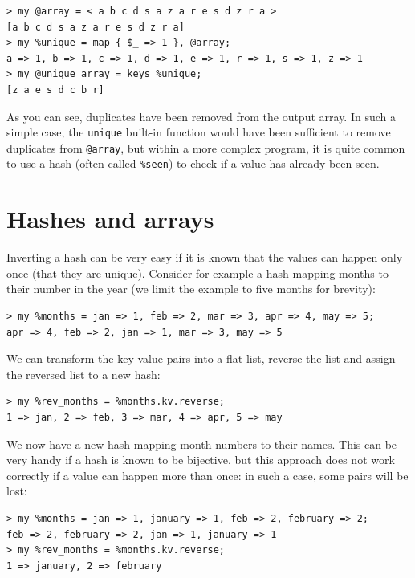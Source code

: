 \begin{verbatim}
> my @array = < a b c d s a z a r e s d z r a >
[a b c d s a z a r e s d z r a]
> my %unique = map { $_ => 1 }, @array;
a => 1, b => 1, c => 1, d => 1, e => 1, r => 1, s => 1, z => 1
> my @unique_array = keys %unique;
[z a e s d c b r]
\end{verbatim}

As you can see, duplicates have been removed from the output array. In such a simple case, the {\tt unique} built-in function 
would have been sufficient to remove duplicates from 
\verb'@array', but within a more complex program, 
it is quite common to use a hash (often called \verb'%seen') 
to check if a value has already been seen.

\section{Hashes and arrays}
\label{invert}

Inverting a hash can be very easy if it is known that the 
values can happen only once (that they are unique). Consider 
for example a hash mapping months to their number in the year 
(we limit the example to five months for brevity):

\begin{verbatim}
> my %months = jan => 1, feb => 2, mar => 3, apr => 4, may => 5;
apr => 4, feb => 2, jan => 1, mar => 3, may => 5
\end{verbatim}
%

We can transform the key-value pairs into a flat list, 
reverse the list and assign the reversed list to a new 
hash:

\begin{verbatim}
> my %rev_months = %months.kv.reverse;
1 => jan, 2 => feb, 3 => mar, 4 => apr, 5 => may
\end{verbatim}
%

We now have a new hash mapping month numbers to their names.
This can be very handy if a hash is known to be bijective, but this approach does not work correctly if a value can 
happen more than once: in such a case, some pairs will be 
lost:

\begin{verbatim}
> my %months = jan => 1, january => 1, feb => 2, february => 2;
feb => 2, february => 2, jan => 1, january => 1
> my %rev_months = %months.kv.reverse;
1 => january, 2 => february
\end{verbatim}

